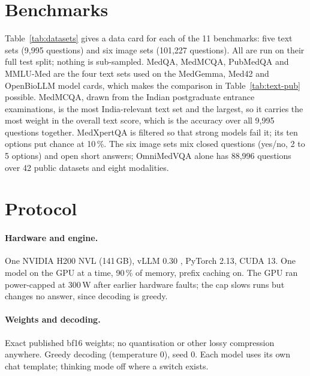 \documentclass{article}
\newcommand{\pct}{\,\%}
\begin{document}
\section{Benchmarks}
\label{sec:data}

Table~\ref{tab:datasets} gives a data card for each of the 11 benchmarks: five text sets (9,995 questions) and six image sets (101,227 questions). All are run on their full test split; nothing is sub-sampled. MedQA, MedMCQA, PubMedQA and MMLU-Med are the four text sets used on the MedGemma, Med42 and OpenBioLLM model cards, which makes the comparison in Table~\ref{tab:text-pub} possible. MedMCQA, drawn from the Indian postgraduate entrance examinations, is the most India-relevant text set and the largest, so it carries the most weight in the overall text score, which is the accuracy over all 9,995 questions together. MedXpertQA is filtered so that strong models fail it; its ten options put chance at 10\pct{}. The six image sets mix closed questions (yes/no, 2 to 5 options) and open short answers; OmniMedVQA alone has 88,996 questions over 42 public datasets and eight modalities.

\begin{table}[htbp]
\centering\footnotesize\setlength{\tabcolsep}{4pt}
\caption{Data cards of the 11 benchmarks. Text sets above the rule (9,995 questions), image sets below (101,227 questions). Chance = the score of random guessing.}
\label{tab:datasets}

\end{table}

\section{Protocol}
\label{sec:protocol}

\paragraph{Hardware and engine.} One NVIDIA H200 NVL (141\,GB), vLLM 0.30 \citep{kwon2023vllm}, PyTorch 2.13, CUDA 13. One model on the GPU at a time, 90\pct{} of memory, prefix caching on. The GPU ran power-capped at 300\,W after earlier hardware faults; the cap slows runs but changes no answer, since decoding is greedy.

\paragraph{Weights and decoding.} Exact published bf16 weights; no quantisation or other lossy compression anywhere. Greedy decoding (temperature 0), seed 0. Each model uses its own chat template; thinking mode off where a switch exists.
\end{document}
